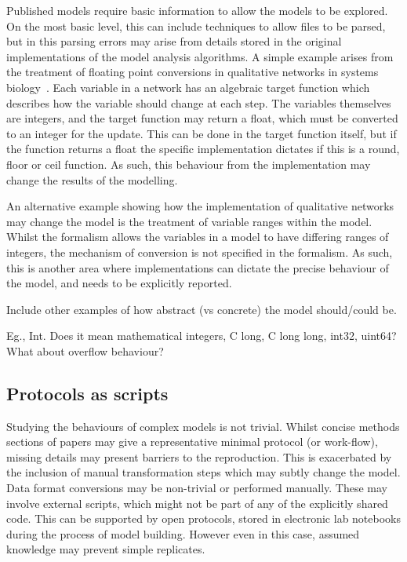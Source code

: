 \documentclass[conference]{IEEEtran}
\begin{document}
Published models require basic information to allow the models to be
explored. On the most basic level, this can include techniques to allow
files to be parsed, but in this parsing errors may arise from details 
stored in the original implementations of the model analysis algorithms.
A simple example arises from the treatment of floating point conversions
in qualitative networks in systems biology~\cite{Schaub2007}. Each
variable in a network has an algebraic target function which describes
how the variable should change at each step. The variables themselves are
integers, and the target function may return a float, which must be converted
to an integer for the update. This can be done in the target function 
itself, but if the function returns a float the specific implementation
dictates if this is a round, floor or ceil function. As such, this behaviour
from the implementation may change the results of the modelling.

An alternative example showing how the implementation of qualitative networks
may change the model is the treatment of variable ranges within the model.
Whilst the formalism allows the variables in a model to have differing 
ranges of integers, the mechanism of conversion is not specified in the 
formalism. As such, this is another area where implementations can dictate
the precise behaviour of the model, and needs to be explicitly reported.

Include other examples of how abstract (vs concrete) the model should/could be. 

Eg., Int. Does it mean mathematical integers, C long, C long long, int32, uint64? 
What about overflow behaviour? 




\subsection{Protocols as scripts}



Studying the behaviours of complex models is not trivial. Whilst 
concise methods sections of papers may give a representative minimal
protocol (or work-flow), missing details may present barriers to 
the reproduction. This is exacerbated by the inclusion of manual 
transformation steps which may subtly change the model. Data format 
conversions may be non-trivial or performed manually. These may 
involve external scripts, which might not be part of any of the
explicitly shared code. This can be supported by open protocols, stored 
in electronic lab notebooks during the process of model building. However
even in this case, assumed knowledge may prevent simple replicates.
\end{document}

